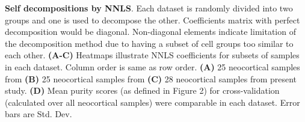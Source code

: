 \textbf{Self decompositions by NNLS}.
 Each dataset is randomly divided into two groups and one is used to decompose the other. Coefficients matrix with perfect decomposition would be diagonal. Non-diagonal elements indicate limitation of the decomposition method due to having a subset of cell groups too similar to each other. \textbf{(A-C)} Heatmaps illustrate NNLS coefficients for subsets of samples in each dataset. Column order is same as row order. \textbf{(A)} 25 neocortical samples from \cite{Tasic_2018} \textbf{(B)} 25 neocortical samples from \cite{Zeisel_2018} \textbf{(C)} 28 neocortical samples from present study. \textbf{(D)} Mean purity scores (as defined in Figure 2) for cross-validation (calculated over all neocortical samples) were comparable in each dataset. Error bars are Std. Dev.
 
